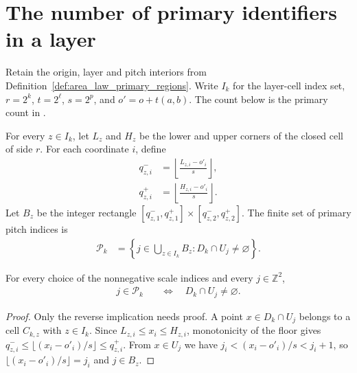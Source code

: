 \section{The number of primary identifiers in a layer}
\label{sec:area_law_primary_count}

Retain the origin, layer and pitch interiors from
Definition~\ref{def:area_law_primary_regions}. Write $I_k$ for the
layer-cell index set, $r=2^k$, $t=2^\ell$, $s=2^p$, and
$o'=o+t(a,b)$. The count below is the primary count in
\cite[Section~11]{OpenAI2026AreaLaw}.


\begin{definition}
    \label{def:area_law_primary_pitch_indices}
    \leanok
    For every $z\in I_k$, let $L_z$ and $H_z$ be the lower and upper
    corners of the closed cell of side $r$. For each coordinate $i$,
    define
    \begin{align}
        q_{z,i}^- & =\left\lfloor\frac{L_{z,i}-o'_i}{s}\right\rfloor, \\
        q_{z,i}^+ & =\left\lfloor\frac{H_{z,i}-o'_i}{s}\right\rfloor.
    \end{align}
    Let $B_z$ be the integer rectangle
    $[q_{z,1}^-,q_{z,1}^+]\times[q_{z,2}^-,q_{z,2}^+]$.
    The finite set of primary pitch indices is
    \begin{align}
        \mathcal P_k
         & =\left\{j\in\bigcup_{z\in I_k}B_z:
        D_k\cap U_j\ne\varnothing\right\}.
    \end{align}
\end{definition}

\begin{lemma}
    \label{thm:area_law_primary_pitch_membership}
    \leanok
    For every choice of the nonnegative scale indices and every
    $j\in\mathbb Z^2$,
    \begin{align}
        j\in\mathcal P_k & \quad\Longleftrightarrow\quad
        D_k\cap U_j\ne\varnothing.
    \end{align}
\end{lemma}
\begin{proof}\leanok
    Only the reverse implication needs proof. A point $x\in D_k\cap U_j$
    belongs to a cell $C_{k,z}$ with $z\in I_k$. Since $L_{z,i}\le x_i\le H_{z,i}$,
    monotonicity of the floor gives
    $q_{z,i}^-\le\lfloor(x_i-o'_i)/s\rfloor\le q_{z,i}^+$.
    From $x\in U_j$ we have $j_i<(x_i-o'_i)/s<j_i+1$, so
    $\lfloor(x_i-o'_i)/s\rfloor=j_i$ and $j\in B_z$.
\end{proof}

